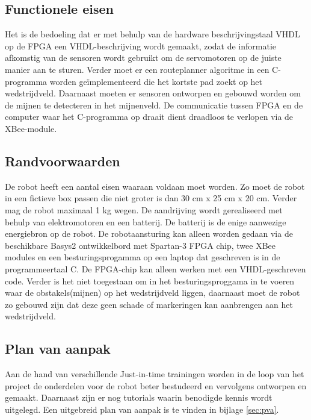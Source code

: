 \documentclass{report}
\begin{document}
\subsection{Functionele eisen}

Het is de bedoeling dat er met behulp van de hardware beschrijvingstaal VHDL op de FPGA een VHDL-beschrijving wordt gemaakt, zodat de informatie afkomstig van de sensoren wordt gebruikt om de servomotoren op de juiste manier aan te sturen. Verder moet er een routeplanner algoritme in een C-programma worden geïmplementeerd die het kortste pad zoekt op het wedstrijdveld. Daarnaast moeten er sensoren ontworpen en gebouwd worden om de mijnen te detecteren in het mijnenveld. De communicatie tussen FPGA en de computer waar het C-programma op draait dient draadloos te verlopen via de XBee-module.

\subsection{Randvoorwaarden}

De robot heeft een aantal eisen waaraan voldaan moet worden. Zo moet de robot in een fictieve box passen die niet groter is dan 30 cm x 25 cm x 20 cm. Verder mag de robot maximaal 1 kg wegen. De aandrijving wordt gerealiseerd met behulp van elektromotoren en een batterij. De batterij is de enige aanwezige energiebron op de robot.
De robotaansturing kan alleen worden gedaan via de beschikbare Basys2 ontwikkelbord met Spartan-3 FPGA chip, twee XBee modules en een besturingsprogamma op een laptop dat geschreven is in de programmeertaal C. De FPGA-chip kan alleen werken met een VHDL-geschreven code.
Verder is het niet toegestaan om in het besturingsproggama in te voeren waar de obstakels(mijnen) op het wedstrijdveld liggen, daarnaast moet de robot zo gebouwd zijn dat deze geen schade of markeringen kan aanbrengen aan het wedstrijdveld.

\subsection{Plan van aanpak}

Aan de hand van verschillende Just-in-time trainingen worden in de loop van het project de onderdelen voor de robot beter bestudeerd en vervolgens ontworpen en gemaakt. Daarnaast zijn er nog tutorials waarin benodigde kennis wordt uitgelegd. Een uitgebreid plan van aanpak is te vinden in bijlage \ref{sec:pva}.
\end{document}
